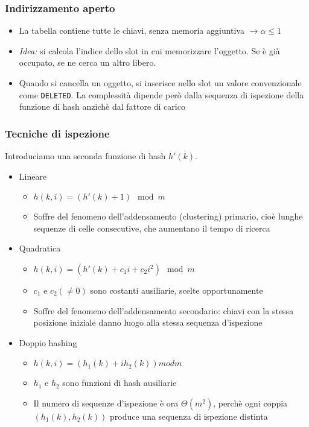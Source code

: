 \documentclass[10pt,a4paper]{article}
\newcommand{\code}{\texttt}
\begin{document}
\begin{multicols*}{2}
\subsubsection*{Indirizzamento aperto}
\begin{itemize}
    \item La tabella contiene tutte le chiavi, senza memoria aggiuntiva $\rightarrow \alpha \le 1$
    \item \emph{Idea:} si calcola l'indice dello slot in cui memorizzare l'oggetto. Se è già occupato, se ne cerca un altro libero.
    \item Quando si cancella un oggetto, si inserisce nello slot un valore convenzionale come \code{DELETED}. La complessità dipende però dalla sequenza di ispezione della funzione di hash anzichè dal fattore di carico
\end{itemize}
\subsubsection*{Tecniche di ispezione}
Introduciamo una seconda funzione di hash $h'(k)$.
\begin{itemize}
    \item Lineare
        \begin{itemize}
            \item $h(k,i)=\left(h'(k)+1\right) \mod{m}$
            \item Soffre del fenomeno dell'addensamento (clustering) primario, cioè lunghe sequenze di celle consecutive, che aumentano il tempo di ricerca
        \end{itemize}
    \item Quadratica
        \begin{itemize}
            \item $h(k,i) = \left(h'(k)+c_1i+c_2i^2\right) \mod{m}$
            \item $c_1$ e $c_2 (\not= 0)$ sono costanti ausiliarie, scelte opportunamente
            \item Soffre del fenomeno dell'addensamento secondario: chiavi con la stessa posizione iniziale danno luogo alla stessa sequenza d'ispezione
        \end{itemize}
    \item Doppio hashing
        \begin{itemize}
            \item $h(k,i) = \left(h_1(k)+ih_2(k)\right) mod{m}$
            \item $h_1$ e $h_2$ sono funzioni di hash ausiliarie
            \item Il numero di sequenze d'ispezione è ora $\varTheta(m^2)$, perchè ogni coppia $(h_1(k), h_2(k))$ produce una sequenza di ispezione distinta
        \end{itemize}
\end{itemize}

\end{multicols*}
\end{document}

